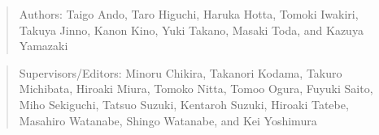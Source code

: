 \begin{quotation}
  Authors:
  Taigo Ando,
  Taro Higuchi,
  Haruka Hotta,
  Tomoki Iwakiri,
  Takuya Jinno,
  Kanon Kino,
  Yuki Takano,
  Masaki Toda,
  and
  Kazuya Yamazaki
\end{quotation}
\begin{quotation}
  Supervisors/Editors:
  Minoru Chikira,
  Takanori Kodama,
  Takuro Michibata,
  Hiroaki Miura,
  Tomoko Nitta,
  Tomoo Ogura,
  Fuyuki Saito,
  Miho Sekiguchi,
  Tatsuo
  Suzuki,
  Kentaroh Suzuki,
  Hiroaki Tatebe,
  Masahiro Watanabe,
  Shingo Watanabe,
  and
  Kei Yoshimura
\end{quotation}
